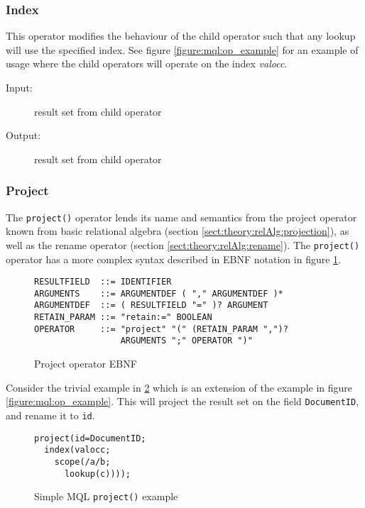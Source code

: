 \subsubsection{Index}
\label{sect:method:marsOperators:index}
This operator modifies the behaviour of the child operator such that any lookup
will use the specified index. See figure \ref{figure:mql:op_example} for an
example of usage where the child operators will operate on the index
\textit{valocc}.

\begin{description}
  \item[Input:] result set from child operator
  \item[Output:] result set from child operator
\end{description}

\subsubsection{Project}
\label{sect:method:marsOperators:project}
The \texttt{project()} operator lends its name and semantics from the project operator known from basic relational
algebra (section \ref{sect:theory:relAlg:projection}), as well as the rename operator (section
\ref{sect:theory:relAlg:rename}). The \texttt{project()} operator has a more complex syntax described in EBNF
notation in figure \ref{figure:mql:ebnf:project_ebnf}.

\begin{figure}[!h]
\centering
\begin{Verbatim}
RESULTFIELD  ::= IDENTIFIER
ARGUMENTS    ::= ARGUMENTDEF ( "," ARGUMENTDEF )*
ARGUMENTDEF  ::= ( RESULTFIELD "=" )? ARGUMENT
RETAIN_PARAM ::= "retain:=" BOOLEAN
OPERATOR     ::= "project" "(" (RETAIN_PARAM ",")? 
                 ARGUMENTS ";" OPERATOR ")"
\end{Verbatim}
\caption{Project operator EBNF}
\label{figure:mql:ebnf:project_ebnf}
\end{figure}
Consider the trivial example in \ref{figure:mql:project_example} which is an
extension of the example in figure \ref{figure:mql:op_example}. This will
project the result set on the field \texttt{DocumentID}, and rename it to
\texttt{id}. 

\begin{figure}[!h]
\centering
\begin{Verbatim}
project(id=DocumentID;
  index(valocc; 
    scope(/a/b;
      lookup(c))));
\end{Verbatim}
\caption{Simple MQL \texttt{project()} example}
\label{figure:mql:project_example}
\end{figure}

